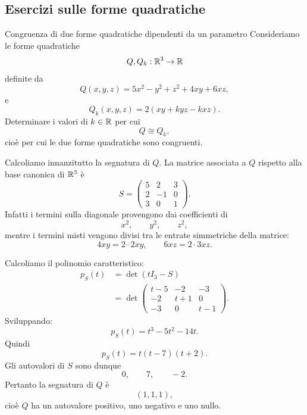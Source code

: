 \documentclass[a4paper]{article}
\begin{document}
\subsection{Esercizi sulle forme quadratiche}

\begin{snippetexercise}{Congruenza di due forme quadratiche dipendenti da un parametro}
    Consideriamo le forme quadratiche
    \[
        Q,Q_k:\mathbb{R}^3\to\mathbb{R}
    \]
    definite da
    \[
        Q(x,y,z)=5x^2-y^2+z^2+4xy+6xz,
    \]
    e
    \[
        Q_k(x,y,z)=2(xy+kyz-kxz).
    \]
    Determinare i valori di \(k\in\mathbb{R}\) per cui
    \[
        Q\cong Q_k,
    \]
    cioè per cui le due forme quadratiche sono congruenti.
\end{snippetexercise}

\begin{snippetsolution}{}
    Calcoliamo innanzitutto la segnatura di \(Q\). La matrice associata a \(Q\) rispetto alla base canonica di \(\mathbb{R}^3\) è
    \[
        S=
        \begin{pmatrix}
            5 & 2 & 3\\
            2 & -1 & 0\\
            3 & 0 & 1
        \end{pmatrix}.
    \]
    Infatti i termini sulla diagonale provengono dai coefficienti di
    \[
        x^2,\qquad y^2,\qquad z^2,
    \]
    mentre i termini misti vengono divisi tra le entrate simmetriche della matrice:
    \[
        4xy=2\cdot 2xy,
        \qquad
        6xz=2\cdot 3xz.
    \]

    Calcoliamo il polinomio caratteristico:
    \begin{align*}
        p_S(t)
        &=
        \det(tI_3-S)\\
        &=
        \det
        \begin{pmatrix}
            t-5 & -2 & -3\\
            -2 & t+1 & 0\\
            -3 & 0 & t-1
        \end{pmatrix}.
    \end{align*}
    Sviluppando:
    \[
        p_S(t)
        =
        t^3-5t^2-14t.
    \]
    Quindi
    \[
        p_S(t)=t(t-7)(t+2).
    \]
    Gli autovalori di \(S\) sono dunque
    \[
        0,\qquad 7,\qquad -2.
    \]
    Pertanto la segnatura di \(Q\) è
    \[
        (1,1,1),
    \]
    cioè \(Q\) ha un autovalore positivo, uno negativo e uno nullo.


\end{snippetsolution}
\end{document}
